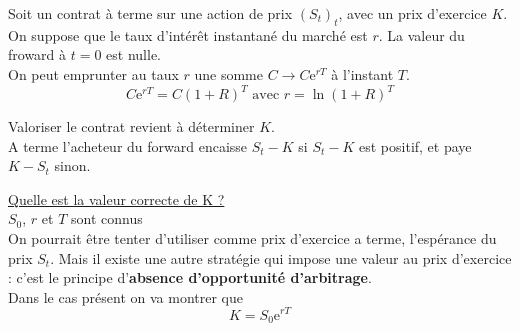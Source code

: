 \documentclass{report}
\begin{document}
\vspace{0.2cm}
Soit un contrat à terme sur une action de prix $(S_t)_t$, avec un prix d'exercice $K$. On suppose que le taux d'intérêt instantané du marché est $r$. La valeur du froward à $t=0$ est nulle.\\
On peut emprunter au taux $r$ une somme $C\to C \mbox{e}^{rT}$ à l'instant $T$.
\[ C \mbox{e}^{rT} = C(1+R)^T \mbox{ avec } r = \ln(1+R)^T\]

\vspace{0.2cm}
Valoriser le contrat revient à déterminer $K$. \\
A terme l'acheteur du forward encaisse $S_t-K$ si $S_t-K$ est positif, et paye $K-S_t$ sinon.

\vspace{0.3cm}
\underline{Quelle est la valeur correcte de K ?}\\
$S_0$, $r$ et $T$ sont connus\\
On pourrait être tenter d'utiliser comme prix d'exercice a terme, l'espérance du prix $S_t$. Mais il existe une autre stratégie qui impose une valeur au prix d'exercice : c'est le principe d'\textbf{absence d'opportunité d'arbitrage}.\\
Dans le cas présent on va montrer que \[K=S_0\mbox{e}^{rT}\]
\end{document}
